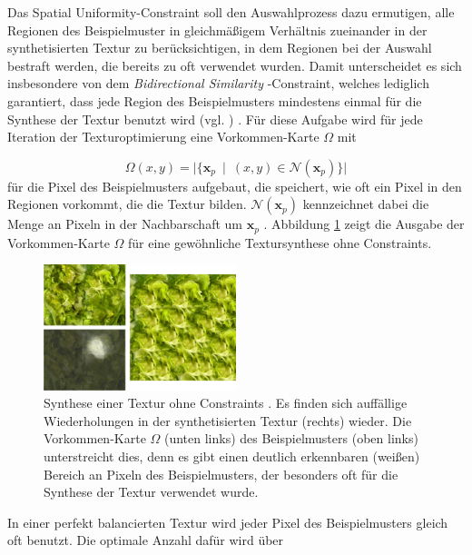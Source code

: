 Das \glqq Spatial Uniformity\grqq -Constraint soll den Auswahlprozess dazu ermutigen, alle Regionen des Beispielmuster in gleichmäßigem Verhältnis zueinander in der synthetisierten Textur zu berücksichtigen, in dem Regionen bei der Auswahl bestraft werden, die bereits zu oft verwendet wurden.
Damit unterscheidet es sich insbesondere von dem \emph{\glqq Bidirectional Similarity\grqq} -Constraint, welches lediglich garantiert, dass jede Region des Beispielmusters mindestens einmal für die Synthese der Textur benutzt wird (vgl. \cite{BidirectionalSimilarity}) \cite{SelfTuning}.
Für diese Aufgabe wird für jede Iteration der Texturoptimierung eine Vorkommen-Karte $\Omega$ mit

\begin{equation*}
	\Omega(x,y) = \big| \lbrace \textbf{x}_p \ \mid \ (x,y) \in \mathcal{N}(\textbf{x}_p) \rbrace \big|
\end{equation*}
für die Pixel des Beispielmusters aufgebaut, die speichert, wie oft ein Pixel in den Regionen vorkommt, die die Textur bilden.
$\mathcal{N}(\textbf{x}_p)$ kennzeichnet dabei die Menge an Pixeln in der Nachbarschaft um $\textbf{x}_p$ \cite{SelfTuning}.
Abbildung \ref{occurence-map} zeigt die Ausgabe der Vorkommen-Karte $\Omega$ für eine gewöhnliche Textursynthese ohne Constraints.

\begin{figure}
	\centering
	\includegraphics[width=0.5\textwidth]{images/occurence-map}
	\caption{
		Synthese einer Textur ohne Constraints \cite{SelfTuning}.
		Es finden sich auffällige Wiederholungen in der synthetisierten Textur (rechts) wieder.
		Die Vorkommen-Karte $\Omega$ (unten links) des Beispielmusters (oben links) unterstreicht dies, denn es gibt einen deutlich erkennbaren (weißen) Bereich an Pixeln des Beispielmusters, der besonders oft für die Synthese der Textur verwendet wurde.
	}
	\label{occurence-map}
\end{figure}

In einer perfekt balancierten Textur wird jeder Pixel des Beispielmusters gleich oft benutzt.
Die optimale Anzahl dafür wird über

